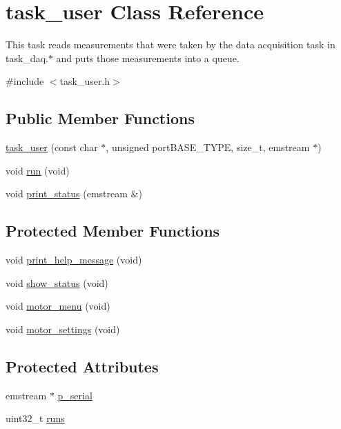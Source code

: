 \hypertarget{classtask__user}{\section{task\-\_\-user \-Class \-Reference}
\label{classtask__user}
}


\-This task reads measurements that were taken by the data acquisition task in task\-\_\-daq.$\ast$ and puts those measurements into a queue.  




{\ttfamily \#include $<$task\-\_\-user.\-h$>$}

\subsection*{\-Public \-Member \-Functions}
\begin{DoxyCompactItemize}
\item 
\hyperlink{classtask__user_a3aba77563b375bb14838800608da48bc}{task\-\_\-user} (const char $\ast$, unsigned port\-B\-A\-S\-E\-\_\-\-T\-Y\-P\-E, size\-\_\-t, emstream $\ast$)
\item 
void \hyperlink{classtask__user_adca6429d57be25e8d411414fc8ad75af}{run} (void)
\item 
void \hyperlink{classtask__user_a78170e5ebe8dca1ce0a5a09c507399f1}{print\-\_\-status} (emstream \&)
\end{DoxyCompactItemize}
\subsection*{\-Protected \-Member \-Functions}
\begin{DoxyCompactItemize}
\item 
void \hyperlink{classtask__user_a75475060f83bae1e44bcc8a5c34015c7}{print\-\_\-help\-\_\-message} (void)
\item 
void \hyperlink{classtask__user_a105bebbd9cb1031154c3dfc3662db4a0}{show\-\_\-status} (void)
\item 
void \hyperlink{classtask__user_a62e9a23d2a052ef1c34ef4c6f1152032}{motor\-\_\-menu} (void)
\item 
void \hyperlink{classtask__user_aab1a6f3f0ea7acce28c845a0cf992e6d}{motor\-\_\-settings} (void)
\end{DoxyCompactItemize}
\subsection*{\-Protected \-Attributes}
\begin{DoxyCompactItemize}
\item 
emstream $\ast$ \hyperlink{classtask__user_a04ed5c2b4d7c9a1530bde6f217e01681}{p\-\_\-serial}
\item 
uint32\-\_\-t \hyperlink{classtask__user_ac85973422902084fc9a4692250be32fe}{runs}
\end{DoxyCompactItemize}


